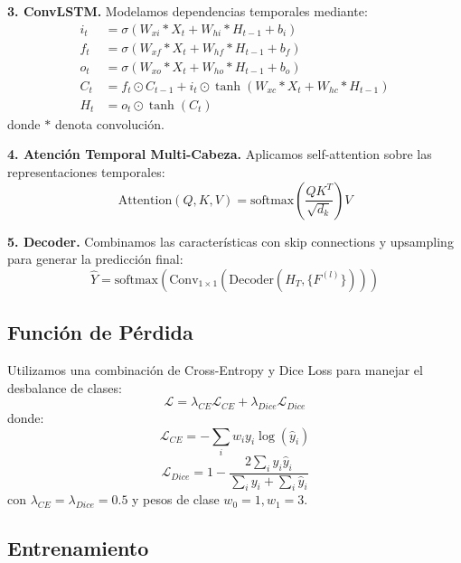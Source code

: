\documentclass[conference]{IEEEtran}
\begin{document}
\textbf{3. ConvLSTM.} Modelamos dependencias temporales mediante:
\begin{align}
    i_t &= \sigma(W_{xi} * X_t + W_{hi} * H_{t-1} + b_i) \\
    f_t &= \sigma(W_{xf} * X_t + W_{hf} * H_{t-1} + b_f) \\
    o_t &= \sigma(W_{xo} * X_t + W_{ho} * H_{t-1} + b_o) \\
    C_t &= f_t \odot C_{t-1} + i_t \odot \tanh(W_{xc} * X_t + W_{hc} * H_{t-1}) \\
    H_t &= o_t \odot \tanh(C_t)
\end{align}
donde $*$ denota convolución.

\textbf{4. Atención Temporal Multi-Cabeza.} Aplicamos self-attention sobre las representaciones temporales:
\begin{equation}
    \text{Attention}(Q, K, V) = \text{softmax}\left(\frac{QK^T}{\sqrt{d_k}}\right)V
\end{equation}

\textbf{5. Decoder.} Combinamos las características con skip connections y upsampling para generar la predicción final:
\begin{equation}
    \hat{Y} = \text{softmax}(\text{Conv}_{1\times1}(\text{Decoder}(H_T, \{F^{(l)}\})))
\end{equation}

\subsection{Función de Pérdida}

Utilizamos una combinación de Cross-Entropy y Dice Loss para manejar el desbalance de clases:
\begin{equation}
    \mathcal{L} = \lambda_{CE} \mathcal{L}_{CE} + \lambda_{Dice} \mathcal{L}_{Dice}
\end{equation}
donde:
\begin{equation}
    \mathcal{L}_{CE} = -\sum_{i} w_i y_i \log(\hat{y}_i)
\end{equation}
\begin{equation}
    \mathcal{L}_{Dice} = 1 - \frac{2\sum_i y_i \hat{y}_i}{\sum_i y_i + \sum_i \hat{y}_i}
\end{equation}
con $\lambda_{CE} = \lambda_{Dice} = 0.5$ y pesos de clase $w_0 = 1, w_1 = 3$.

\subsection{Entrenamiento}
\end{document}
